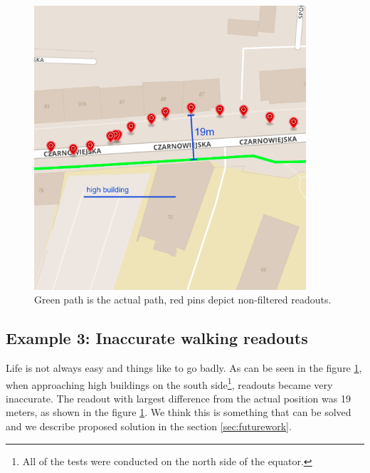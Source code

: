 \begin{figure}[]
    \includegraphics[width=0.9\textwidth]{images/3.png}
    \caption{Green path is the actual path, red pins depict non-filtered readouts.}
    \label{fig:screenexample3}
\end{figure}

\subsection{Example 3: Inaccurate walking readouts} \label{sec:inaccuratereadoutsexample}

Life is not always easy and things like to go badly. As can be seen in the figure \ref{fig:screenexample3}, when approaching high buildings on the south side\footnote{All of the tests were conducted on the north side of the equator.}, readouts became very inaccurate. The readout with largest difference from the actual position was 19 meters, as shown in the figure \ref{fig:screenexample3}. We think this is something that can be solved and we describe proposed solution in the section \ref{sec:futurework}.
